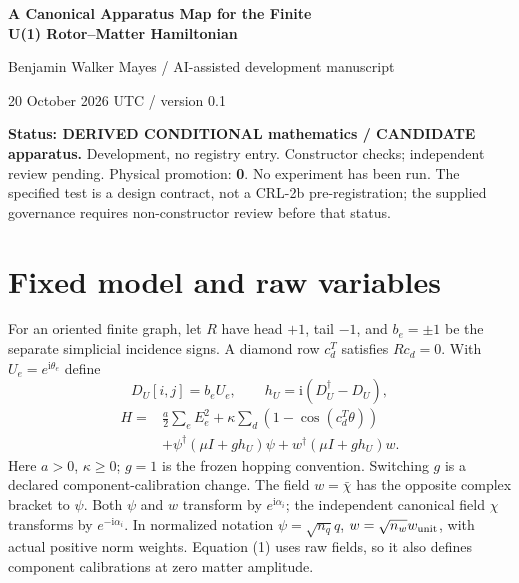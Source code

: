 \documentclass[10pt,a4paper]{article}
\newcommand{\ii}{\mathrm i}
\begin{document}
\begin{center}
{\Large\bfseries A Canonical Apparatus Map for the Finite\protect\\ U(1) Rotor--Matter Hamiltonian}\par
\vspace{7pt}{\large One instrumented incidence-diamond test}\par
\vspace{6pt}Benjamin Walker Mayes / AI-assisted development manuscript\par
20 October 2026 UTC / version 0.1
\end{center}
\begin{abstract}
We specify a scaled canonical map from ideal electrical flux--charge coordinates to the declared classical rank-one link--matter model. A shared action scale fixes the relation between laboratory energy and model time. The second species uses the conjugated complex coordinate, preserving ordinary positive canonical hardware pairs while producing the required opposite complex Poisson bracket. We derive reciprocal currents, a local Gauss-source law and the reduced pure-field pendulum on one incidence diamond. The appendix specifies an instrumented component test with raw data, controls and explicit engineering acceptance gates. The canonical transformation is standard Hamiltonian mathematics specialized to this model; no general novelty claim is made. Actual nonlinear circuit realization and calibration remain experimental obligations.
\end{abstract}
\textbf{Status: DERIVED CONDITIONAL mathematics / CANDIDATE apparatus.}
Development, no registry entry. Constructor checks; independent review pending. Physical promotion: \textbf{0}. No experiment has been run. The specified test is a design contract, not a CRL-2b pre-registration; the supplied governance requires non-constructor review before that status.

\section{Fixed model and raw variables}
For an oriented finite graph, let $R$ have head $+1$, tail $-1$, and $b_e=\pm1$ be the separate simplicial incidence signs. A diamond row $c_d^T$ satisfies $Rc_d=0$. With $U_e=e^{\ii\theta_e}$ define
\[
D_U[i,j]=b_eU_e,\qquad h_U=\ii(D_U^\dagger-D_U),
\]
\begin{equation}
\begin{split}
H={}&\frac a2\sum_e E_e^2+\kappa\sum_d(1-\cos(c_d^T\theta))\\
&+\psi^\dagger(\mu I+g h_U)\psi+w^\dagger(\mu I+g h_U)w.
\end{split}\tag{1}
\end{equation}
Here $a>0$, $\kappa\ge0$; $g=1$ is the frozen hopping convention. Switching $g$ is a declared component-calibration change. The field $w=\bar\chi$ has the opposite complex bracket to $\psi$. Both $\psi$ and $w$ transform by $e^{\ii\alpha_i}$; the independent canonical field $\chi$ transforms by $e^{-\ii\alpha_i}$. In normalized notation $\psi=\sqrt{n_q}q$, $w=\sqrt{n_w}w_{\rm unit}$, with actual positive norm weights. Equation (1) uses raw fields, so it also defines component calibrations at zero matter amplitude.
\end{document}
